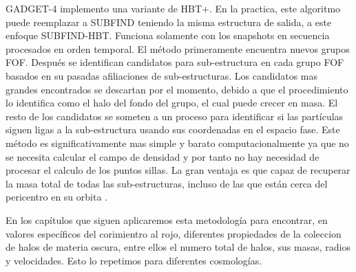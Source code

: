 GADGET-4 implemento una variante de HBT+. En la practica, este algoritmo puede reemplazar a SUBFIND teniendo la misma estructura de salida, a este enfoque SUBFIND-HBT. Funciona solamente con los snapshots en secuencia procesados en orden temporal. El método primeramente encuentra nuevos grupos FOF. Después se identifican candidatos para sub-estructura en cada grupo FOF basados en su pasadas afiliaciones de sub-estructuras. Los candidatos mas grandes encontrados se descartan por el momento, debido a que el procedimiento lo identifica como el halo del fondo del grupo, el cual puede crecer en masa. El resto de los candidatos se someten a un proceso para identificar si las partículas siguen ligas a la sub-estructura usando sus coordenadas en el espacio fase. Este método es significativamente mas simple y barato computacionalmente ya que no se necesita calcular el campo de densidad y por tanto no hay necesidad de procesar el calculo de los puntos sillas. La gran ventaja es que capaz de recuperar la masa total de todas las sub-estructuras, incluso de las que están cerca del pericentro en su orbita \cite{2021MNRAS.506.2871S}.

{\blues En los capítulos que siguen aplicaremos esta metodología para encontrar, en valores específicos del corimientro al rojo, diferentes propiedades de la coleccion de halos de materia oscura, entre ellos el numero total de halos, sus masas, radios y velocidades. Esto lo repetimos para diferentes cosmologías.}